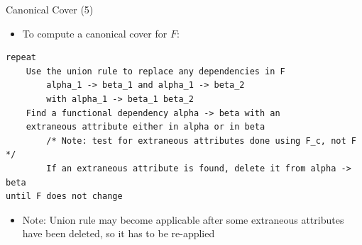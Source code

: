 \documentclass[aspectratio=169, xcolor=dvipsnames]{beamer}
\begin{document}
\begin{frame}[fragile]{Canonical Cover (5)}
    \begin{itemize}[<+->]
        \item To compute a canonical cover for $F$:
    \end{itemize}
    \vspace{1em}
    \begin{verbatim}
repeat
    Use the union rule to replace any dependencies in F
        alpha_1 -> beta_1 and alpha_1 -> beta_2
        with alpha_1 -> beta_1 beta_2
    Find a functional dependency alpha -> beta with an 
    extraneous attribute either in alpha or in beta
        /* Note: test for extraneous attributes done using F_c, not F */
        If an extraneous attribute is found, delete it from alpha -> beta
until F does not change
    \end{verbatim}
    \begin{itemize}[<+(1)->]
        \item Note: Union rule may become applicable after some extraneous attributes have been deleted, so it has to be re-applied
    \end{itemize}
\end{frame}
\end{document}
